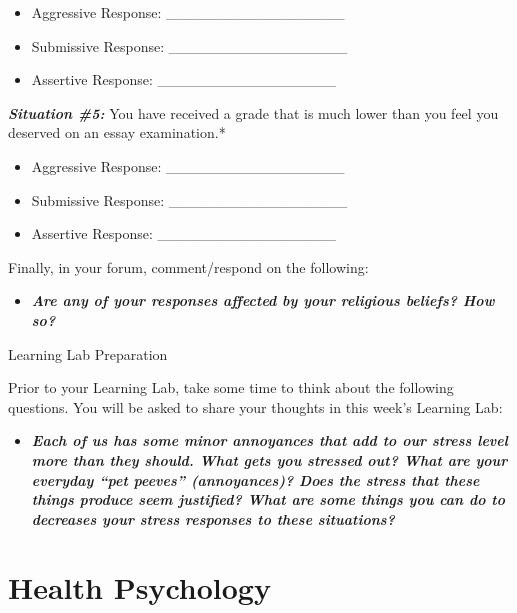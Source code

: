 \documentclass[
]{book}
\providecommand{\tightlist}{%
  \setlength{\itemsep}{0pt}\setlength{\parskip}{0pt}}
\begin{document}
\begin{reflect}
\begin{itemize}
\tightlist
\item
  Aggressive Response: \_\_\_\_\_\_\_\_\_\_\_\_\_\_\_\_\_\\
\item
  Submissive Response: \_\_\_\_\_\_\_\_\_\_\_\_\_\_\_\_\_\\
\item
  Assertive Response: \_\_\_\_\_\_\_\_\_\_\_\_\_\_\_\_\_
\end{itemize}

\textbf{\emph{Situation \#5:}} You have received a grade that is much lower than you feel you deserved on an essay examination.*

\begin{itemize}
\tightlist
\item
  Aggressive Response: \_\_\_\_\_\_\_\_\_\_\_\_\_\_\_\_\_\\
\item
  Submissive Response: \_\_\_\_\_\_\_\_\_\_\_\_\_\_\_\_\_\\
\item
  Assertive Response: \_\_\_\_\_\_\_\_\_\_\_\_\_\_\_\_\_
\end{itemize}

Finally, in your forum, comment/respond on the following:

\begin{itemize}
\tightlist
\item
  \textbf{\emph{Are any of your responses affected by your religious beliefs? How so?}}
\end{itemize}

{Learning Lab Preparation}

Prior to your Learning Lab, take some time to think about the following questions. You will be asked to share your thoughts in this week's Learning Lab:

\begin{itemize}
\tightlist
\item
  \textbf{\emph{Each of us has some minor annoyances that add to our stress level more than they should. What gets you stressed out? What are your everyday ``pet peeves'' (annoyances)? Does the stress that these things produce seem justified? What are some things you can do to decreases your stress responses to these situations?}}
\end{itemize}
\end{reflect}

\hypertarget{health-psychology}{%
\section{Health Psychology}\label{health-psychology}}
\end{document}
